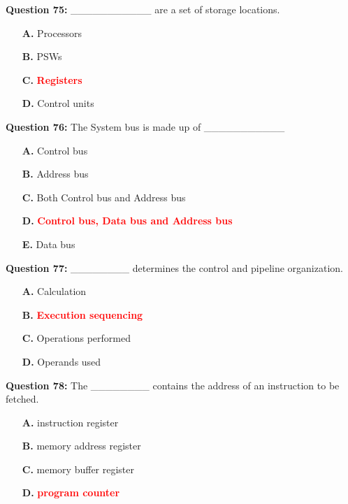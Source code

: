 \documentclass[12pt,a4paper]{article}
\begin{document}
\textbf{Question 75:} ___________ are a set of storage locations.

\begin{itemize}
    \item[\textbf{A.}] Processors
    \item[\textbf{B.}] PSWs
    \item[\textbf{C.}] \textcolor{red}{\textbf{Registers}}
    \item[\textbf{D.}] Control units
\end{itemize}

\vspace{0.5cm}

\textbf{Question 76:} The System bus is made up of ___________

\begin{itemize}
    \item[\textbf{A.}] Control bus
    \item[\textbf{B.}] Address bus
    \item[\textbf{C.}] Both Control bus and Address bus
    \item[\textbf{D.}] \textcolor{red}{\textbf{Control bus, Data bus and Address bus}}
    \item[\textbf{E.}] Data bus
\end{itemize}

\vspace{0.5cm}

\textbf{Question 77:} ________ determines the control and pipeline organization.

\begin{itemize}
    \item[\textbf{A.}] Calculation
    \item[\textbf{B.}] \textcolor{red}{\textbf{Execution sequencing}}
    \item[\textbf{C.}] Operations performed
    \item[\textbf{D.}] Operands used
\end{itemize}

\vspace{0.5cm}

\textbf{Question 78:} The ________ contains the address of an instruction to be fetched.

\begin{itemize}
    \item[\textbf{A.}] instruction register
    \item[\textbf{B.}] memory address register
    \item[\textbf{C.}] memory buffer register
    \item[\textbf{D.}] \textcolor{red}{\textbf{program counter}}
\end{itemize}
\end{document}
